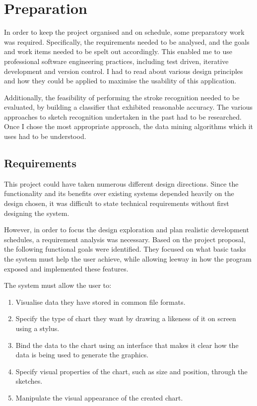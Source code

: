 \chapter{Preparation}
In order to keep the project organised and on schedule, some preparatory work was required. Specifically, the requirements needed to be analysed, and the goals and work items needed to be spelt out accordingly. This enabled me to use professional software engineering practices, including test driven, iterative development and version control. I had to read about various design principles and how they could be applied to maximise the usability of this application.

Additionally, the feasibility of performing the stroke recognition needed to be evaluated, by building a classifier that exhibited reasonable accuracy.  The various approaches to sketch recognition undertaken in the past had to be researched. Once I chose the most appropriate approach, the data mining algorithms which it uses had to be understood.

	\section{Requirements}
	\label{sec:Requirements}
	This project could have taken numerous different design directions. Since the functionality and its benefits over existing systems depended heavily on the design chosen, it was difficult to state technical requirements without first designing the system.
	
	However, in order to focus the design exploration and plan realistic development schedules, a requirement analysis was necessary. Based on the project proposal, the following functional goals were identified. They focused on what basic tasks the system must help the user achieve, while allowing leeway in how the program exposed and implemented these features.
	
	The system must allow the user to:
	\begin{enumerate}[label=\bfseries Core \arabic*]
		\item Visualise data they have stored in common file formats.
		\item Specify the type of chart they want by drawing a likeness of it on screen using a stylus.
		\item Bind the data to the chart using an interface that makes it clear how the data is being used to generate the graphics.
		\item Specify visual properties of the chart, such as size and position, through the sketches.
		\item Manipulate the visual appearance of the created chart.
	\end{enumerate}
	
